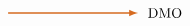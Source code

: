 \documentclass[10pt]{article}
\begin{document}
\[\begin{tikzpicture}[>=latex]
%
\node[] at (0,0)  (uno) {};
\node[] at (10em,0)  (dos) {};
\draw[->,very thick,nbrown]
  (uno) to[out=0,in=180] (dos);
%
%
%    
\end{tikzpicture}
\text{DMO}
\]
\end{document}
